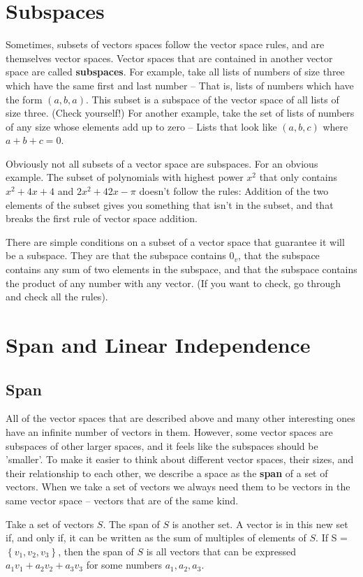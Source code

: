 \documentclass{article}
\begin{document}
\section{Subspaces}
    Sometimes, subsets of vectors spaces follow the vector space rules, and are themselves vector spaces. Vector spaces that are contained in another vector space are called \textbf{subspaces}. 
    For example, take all lists of numbers of size three which have the same first and last number -- That is, lists of numbers which have the form $(a, b, a)$. This subset is a subspace of the vector space of all lists of size three. (Check yourself!)
    For another example, take the set of lists of numbers of any size whose elements add up to zero -- Lists that look like $(a, b, c)$ where $a + b + c = 0$.

    Obviously not all subsets of a vector space are subspaces. For an obvious example. The subset of polynomials with highest power $x^2$ that only contains $x^2 + 4x + 4$ and $2x^2 + 42x - \pi$ doesn't follow the rules: Addition of the two elements of the subset gives you something that isn't in the subset, and that breaks the first rule of vector space addition.
    
There are simple conditions on a subset of a vector space that guarantee it will be a subspace. They are that the subspace contains $0_v$, that the subspace contains any sum of two elements in the subspace, and that the subspace contains the product of any number with any vector. (If you want to check, go through and check all the rules).

\section{Span and Linear Independence}
    \subsection{Span}
   All of the vector spaces that are described above and many other interesting ones have an infinite number of vectors in them. However, some vector spaces are subspaces of other larger spaces, and it feels like the subspaces should be 'smaller'. To make it easier to think about different vector spaces, their sizes, and their relationship to each other, we describe a space as the \textbf{span} of a set of vectors. When we take a set of vectors we always need them to be vectors in the same vector space -- vectors that are of the same kind.

    Take a set of vectors $S$. The span of $S$ is another set. A vector is in this new set if, and only if, it can be written as the sum of multiples of elements of $S$. If S = $\left\{v_1, v_2, v_3\right\}$, then the span of $S$ is all vectors that can be expressed $a_1v_1 + a_2v_2 + a_3v_3$ for some numbers $a_1, a_2, a_3$.
    
\end{document}
